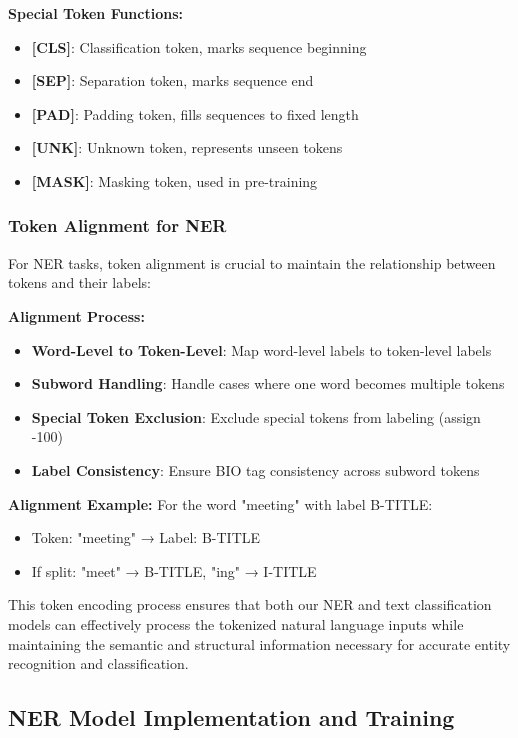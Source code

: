 \documentclass[12pt,a4paper]{article}
\begin{document}
\textbf{Special Token Functions:}
\begin{itemize}
    \item \textbf{[CLS]}: Classification token, marks sequence beginning
    \item \textbf{[SEP]}: Separation token, marks sequence end
    \item \textbf{[PAD]}: Padding token, fills sequences to fixed length
    \item \textbf{[UNK]}: Unknown token, represents unseen tokens
    \item \textbf{[MASK]}: Masking token, used in pre-training
\end{itemize}

\subsubsection{Token Alignment for NER}

For NER tasks, token alignment is crucial to maintain the relationship between tokens and their labels:

\textbf{Alignment Process:}
\begin{itemize}
    \item \textbf{Word-Level to Token-Level}: Map word-level labels to token-level labels
    \item \textbf{Subword Handling}: Handle cases where one word becomes multiple tokens
    \item \textbf{Special Token Exclusion}: Exclude special tokens from labeling (assign -100)
    \item \textbf{Label Consistency}: Ensure BIO tag consistency across subword tokens
\end{itemize}

\textbf{Alignment Example:}
For the word "meeting" with label B-TITLE:
\begin{itemize}
    \item Token: "meeting" → Label: B-TITLE
    \item If split: "meet" → B-TITLE, "ing" → I-TITLE
\end{itemize}

This token encoding process ensures that both our NER and text classification models can effectively process the tokenized natural language inputs while maintaining the semantic and structural information necessary for accurate entity recognition and classification.



\subsection{NER Model Implementation and Training}
\end{document}
